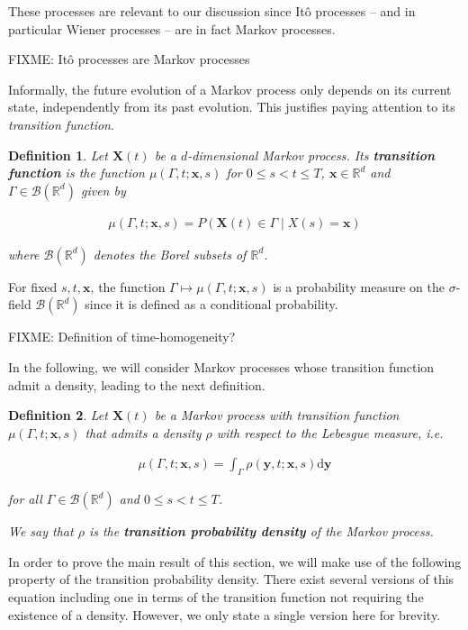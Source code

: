 \documentclass[a4paper]{article}
\newtheorem{definition}{Definition}[section]
\begin{document}
These processes are relevant to our discussion since It\^o processes -- and in particular Wiener processes -- are in fact Markov processes.

FIXME: It\^o processes are Markov processes

Informally, the future evolution of a Markov process only depends on its current state, independently from its past evolution. This justifies paying attention to its \textit{transition function}.

\begin{definition}
  Let $\mathbf{X}(t)$ be a $d$-dimensional Markov process. Its \textbf{transition function} is the function $\mu(\Gamma, t; \mathbf{x}, s)$ for $0 \le s < t \le T$, $\mathbf{x} \in \mathbb{R}^d$ and $\Gamma \in \mathcal{B}(\mathbb{R}^d)$ given by

  \begin{align*}
    \mu(\Gamma, t; \mathbf{x}, s) = P(\mathbf{X}(t) \in \Gamma \mid X(s) = \mathbf{x})
  \end{align*}

  where $\mathcal{B}(\mathbb{R}^d)$ denotes the Borel subsets of $\mathbb{R}^d$.
\end{definition}

For fixed $s,t,\mathbf{x}$, the function $\Gamma \mapsto \mu(\Gamma,t;\mathbf{x},s)$ is a probability measure on the $\sigma$-field $\mathcal{B}(\mathbb{R}^d)$ since it is defined as a conditional probability.

FIXME: Definition of time-homogeneity?

In the following, we will consider Markov processes whose transition function admit a density, leading to the next definition.

\begin{definition}
  Let $\mathbf{X}(t)$ be a Markov process with transition function $\mu(\Gamma,t;\mathbf{x},s)$ that admits a density $\rho$ with respect to the Lebesgue measure, i.e.

  \begin{align*}
    \mu(\Gamma,t;\mathbf{x},s) = \int_\Gamma \rho(\mathbf{y},t;\mathbf{x},s) \mathrm{d}\mathbf{y}
  \end{align*}

  for all $\Gamma \in \mathcal{B}(\mathbb{R}^d)$ and $0 \le s < t \le T$.

  We say that $\rho$ is the \textbf{transition probability density} of the Markov process.
\end{definition}

In order to prove the main result of this section, we will make use of the following property of the transition probability density. There exist several versions of this equation including one in terms of the transition function not requiring the existence of a density. However, we only state a single version here for brevity.
\end{document}
